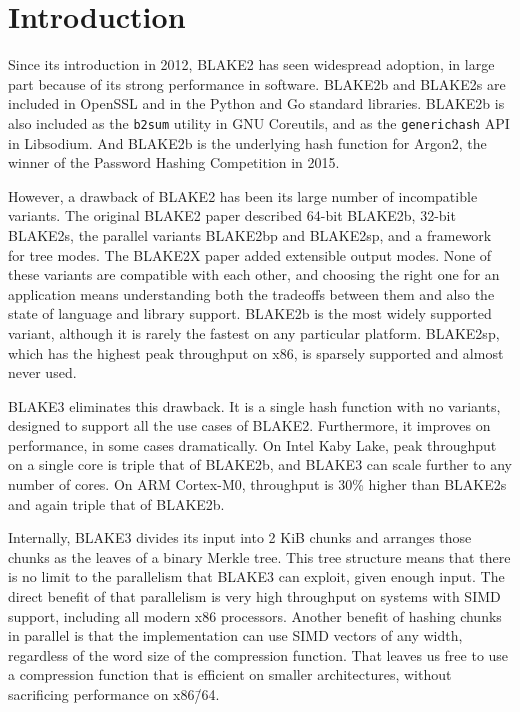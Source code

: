 \documentclass[11pt,notitlepage,a4paper]{article}
\begin{document}
\smallskip

\section{Introduction}\label{sec:intro}

Since its introduction in 2012, BLAKE2 has seen widespread adoption, in large
part because of its strong performance in software. BLAKE2b and BLAKE2s are
included in OpenSSL and in the Python and Go standard libraries. BLAKE2b is
also included as the \texttt{b2sum} utility in GNU Coreutils, and as the
\texttt{generichash} API in Libsodium. And BLAKE2b is the underlying hash
function for Argon2, the winner of the Password Hashing Competition in 2015.

However, a drawback of BLAKE2 has been its large number of incompatible
variants. The original BLAKE2 paper described 64-bit BLAKE2b, 32-bit BLAKE2s,
the parallel variants BLAKE2bp and BLAKE2sp, and a framework for tree modes.
The BLAKE2X paper added extensible output modes. None of these variants are
compatible with each other, and choosing the right one for an application means
understanding both the tradeoffs between them and also the state of language
and library support. BLAKE2b is the most widely supported variant, although it
is rarely the fastest on any particular platform. BLAKE2sp, which has the
highest peak throughput on x86, is sparsely supported and almost never used.

BLAKE3 eliminates this drawback. It is a single hash function with no variants,
designed to support all the use cases of BLAKE2. Furthermore, it improves on
performance, in some cases dramatically. On Intel Kaby Lake, peak throughput on
a single core is triple that of BLAKE2b, and BLAKE3 can scale further to any
number of cores. On ARM Cortex-M0, throughput is 30\% higher than BLAKE2s and
again triple that of BLAKE2b.

Internally, BLAKE3 divides its input into 2 KiB chunks and arranges those
chunks as the leaves of a binary Merkle tree. This tree structure means that
there is no limit to the parallelism that BLAKE3 can exploit, given enough
input. The direct benefit of that parallelism is very high throughput on
systems with SIMD support, including all modern x86 processors. Another benefit
of hashing chunks in parallel is that the implementation can use SIMD vectors
of any width, regardless of the word size of the compression function. That
leaves us free to use a compression function that is efficient on smaller
architectures, without sacrificing performance on x86\=/64.
\end{document}

